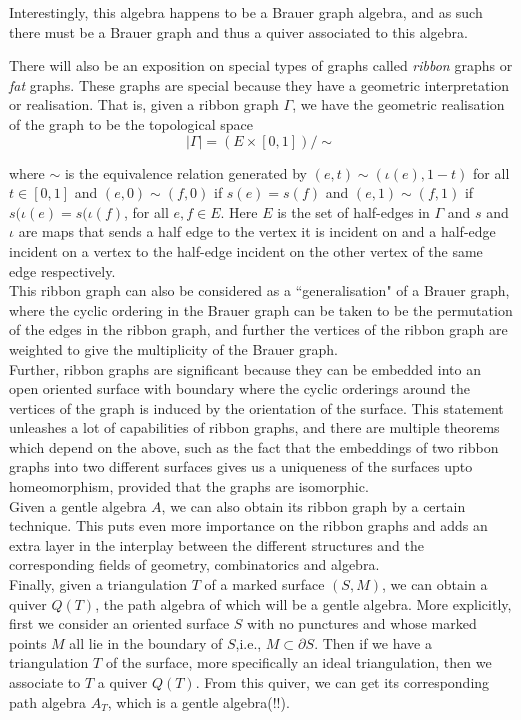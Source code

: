 \documentclass{article}
\numberwithin{figure}{section}
\begin{document}
Interestingly, this algebra happens to be a Brauer graph algebra, and as such there must be a Brauer graph and thus a quiver associated to this algebra.

There will also be an exposition on special types of graphs called \textit{ribbon} graphs or \textit{fat} graphs. These graphs are special because they have a geometric interpretation or realisation. That is, given a ribbon graph $\Gamma$, we have the geometric realisation of the graph to be the topological space
\[
|\Gamma|=(E \times [0,1])/ \sim
\]

where $\sim$ is the equivalence relation generated by $(e,t) \sim (\iota(e), 1-t)$ for all $t\in [0,1]$ and $(e,0) \sim (f,0)$ if $s(e)=s(f)$ and $(e,1)\sim (f,1)$ if $s(\iota(e)=s(\iota(f)$, for all $e,f \in E$. Here $E$ is the set of half-edges in $\Gamma$ and $s$ and $\iota$ are maps that sends a half edge to the vertex it is incident on and a half-edge incident on a vertex to the half-edge incident on the other vertex of the same edge respectively.\\

This ribbon graph can also be considered as a ``generalisation" of a Brauer graph, where the cyclic ordering in the Brauer graph can be taken to be the permutation of the edges in the ribbon graph, and further the vertices of the ribbon graph are weighted to give the multiplicity of the Brauer graph. \\

Further, ribbon graphs are significant because they can be embedded into an open oriented surface with boundary where the cyclic orderings around the vertices of the graph is induced by the orientation of the surface. This statement unleashes a lot of capabilities of ribbon graphs, and there are multiple theorems which depend on the above, such as the fact that the embeddings of two ribbon graphs into two different surfaces gives us a uniqueness of the surfaces upto homeomorphism, provided that the graphs are isomorphic.  \\

Given a gentle algebra $A$, we can also obtain its ribbon graph by a certain technique. This puts even more importance on the ribbon graphs and adds an extra layer in the interplay between the different structures and the corresponding fields of geometry, combinatorics and algebra.\\

Finally, given a triangulation $T$ of a marked surface $(S,M)$, we can obtain a quiver $Q(T)$, the path algebra of which will be a gentle algebra. More explicitly, first we consider an oriented surface $S$ with no punctures and whose marked points $M$ all lie in the boundary of $S$,i.e., $M\subset \partial S$. Then if we have a triangulation $T$ of the surface, more specifically an ideal triangulation, then we associate to $T$ a quiver $Q(T)$. From this quiver, we can get its corresponding path algebra $A_T$, which is a gentle algebra(!!).\\
\end{document}
